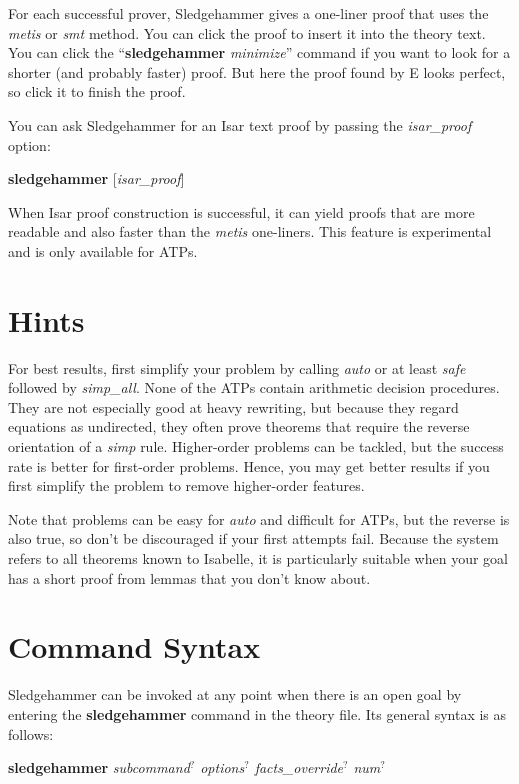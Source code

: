 \documentclass[a4paper,12pt]{article}
\begin{document}
For each successful prover, Sledgehammer gives a one-liner proof that uses the
\textit{metis} or \textit{smt} method. You can click the proof to insert it into
the theory text. You can click the ``\textbf{sledgehammer} \textit{minimize}''
command if you want to look for a shorter (and probably faster) proof. But here
the proof found by E looks perfect, so click it to finish the proof.

You can ask Sledgehammer for an Isar text proof by passing the
\textit{isar\_proof} option:

\prew
\textbf{sledgehammer} [\textit{isar\_proof}]
\postw

When Isar proof construction is successful, it can yield proofs that are more
readable and also faster than the \textit{metis} one-liners. This feature is
experimental and is only available for ATPs.

\section{Hints}
\label{hints}

For best results, first simplify your problem by calling \textit{auto} or at
least \textit{safe} followed by \textit{simp\_all}. None of the ATPs contain
arithmetic decision procedures. They are not especially good at heavy rewriting,
but because they regard equations as undirected, they often prove theorems that
require the reverse orientation of a \textit{simp} rule. Higher-order problems
can be tackled, but the success rate is better for first-order problems. Hence,
you may get better results if you first simplify the problem to remove
higher-order features.

Note that problems can be easy for \textit{auto} and difficult for ATPs, but the
reverse is also true, so don't be discouraged if your first attempts fail.
Because the system refers to all theorems known to Isabelle, it is particularly
suitable when your goal has a short proof from lemmas that you don't know about.

\section{Command Syntax}
\label{command-syntax}

Sledgehammer can be invoked at any point when there is an open goal by entering
the \textbf{sledgehammer} command in the theory file. Its general syntax is as
follows:

\prew
\textbf{sledgehammer} \textit{subcommand\/$^?$ options\/$^?$ facts\_override\/$^?$ num\/$^?$}
\postw
\end{document}
